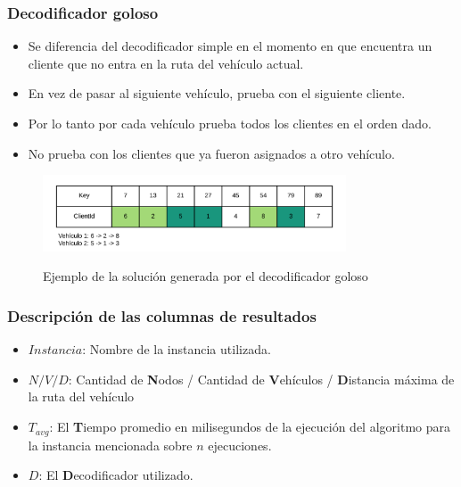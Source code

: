 \documentclass{beamer}
\begin{document}
\begin{frame}
\frametitle{Decodificador goloso}

\begin{itemize}
    \item Se diferencia del decodificador simple en el momento en que encuentra un cliente que no entra en la ruta del vehículo actual.
    \pause
    \item En vez de pasar al siguiente vehículo, prueba con el siguiente cliente.
    \pause
    \item Por lo tanto por cada vehículo prueba todos los clientes en el orden dado.
    \pause
    \item No prueba con los clientes que ya fueron asignados a otro vehículo.
    \pause
\end{itemize}

\begin{figure}[h]
	\caption{Ejemplo de la solución generada por el decodificador goloso}
	\centering
	\includegraphics[width=9cm]{DistribucionClientesDecoGoloso}
	\label{fig:DistribucionClientesDecoGoloso}
\end{figure}

\end{frame}


\begin{frame}
\frametitle{Descripción de las columnas de resultados}

\begin{itemize}
	\item \textbf{$Instancia$}: Nombre de la instancia utilizada.
	\item \textbf{$N/V/D$}: Cantidad de \textbf{N}odos / Cantidad de \textbf{V}ehículos / \textbf{D}istancia máxima de la ruta del vehículo
	\item \textbf{$T_{avg}$}: El \textbf{T}iempo promedio en milisegundos de la ejecución del algoritmo para la instancia mencionada sobre $n$ ejecuciones.
	\item \textbf{$D$}: El \textbf{D}ecodificador utilizado.
\end{itemize}

\end{frame}
\end{document}
